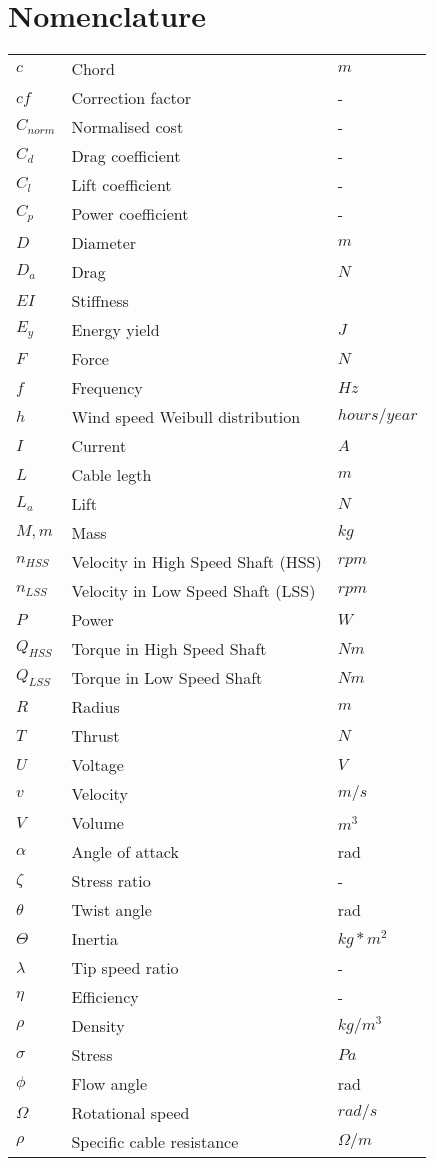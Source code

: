 \section*{Nomenclature}



\vspace{10 mm}
\begin{tabular}{p{3cm} p{7cm} p{4cm}}

$c$ & Chord & $m$ \\
$cf$ & Correction factor & - \\
$C_{norm}$ & Normalised cost & - \\
$C_d$ & Drag coefficient & - \\
$C_l$ & Lift coefficient & - \\
$C_p$ & Power coefficient & - \\
$D$ & Diameter & $m$ \\
$D_a$ & Drag & $N$ \\
$EI$ & Stiffness & \\
$E_y$ & Energy yield & $J$ \\
$F$ & Force & $N$ \\
$f$ & Frequency & $Hz$ \\
$h$ & Wind speed Weibull distribution & $hours/year$ \\ 
$I$ & Current & $A$ \\
$L$ & Cable legth & $m$\\
$L_a$ & Lift & $N$ \\
$M, m$ & Mass & $kg$ \\
$n_{HSS}$ & Velocity in High Speed Shaft (HSS) & $rpm$ \\
$n_{LSS}$ & Velocity in Low Speed Shaft (LSS)& $rpm$ \\
$P$  & Power  & $W$  \\
$Q_{HSS}$ & Torque in High Speed Shaft & $Nm$ \\
$Q_{LSS}$ & Torque in Low Speed Shaft & $Nm$ \\
$R$ & Radius & $m$ \\ 
$T$ & Thrust & $N$ \\
$U$ & Voltage & $V$ \\
$v$ & Velocity & $m/s$ \\
$V$ & Volume & $m^3$ \\

$\alpha$ & Angle of attack & rad \\
$\zeta$ & Stress ratio & - \\
$\theta$ & Twist angle & rad \\
$\Theta$ & Inertia & $kg*m^2$ \\
$\lambda$ & Tip speed ratio & - \\
$\eta$ & Efficiency & - \\
$\rho$ & Density & $kg/m^3$ \\
$\sigma$ & Stress & $Pa$ \\
$\phi$ & Flow angle & rad \\
$\Omega$ & Rotational speed & $rad/s$ \\
$\rho$ & Specific cable resistance & $\Omega /m$\\



\end{tabular}
